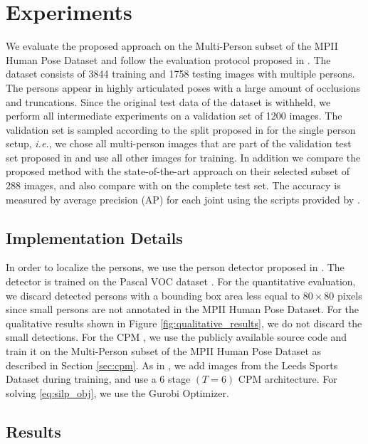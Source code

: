 \documentclass[runningheads]{llncs}
\newcommand{\ie}{\mbox{\emph{i.e.}}}
\begin{document}
\section{Experiments}
We evaluate the proposed approach on the Multi-Person subset of the MPII Human Pose Dataset \cite{andriluka_cvpr2014} and follow the evaluation protocol proposed in \cite{pishchulin2015deepcut}. The dataset consists of 3844 training and 1758 testing images with multiple persons. The persons appear in highly articulated poses with a large amount of occlusions and truncations. Since the original test data of the dataset is withheld, we perform all intermediate experiments on a validation set of 1200 images. The validation set is sampled according to the split proposed in \cite{tompson_cvpr2015} for the single person setup, \ie, we chose all multi-person images that are part of the validation test set proposed in \cite{tompson_cvpr2015} and use all other images for training. In addition we compare the proposed method with the state-of-the-art approach \cite{pishchulin2015deepcut} on their selected subset of 288 images, and also compare with \cite{insafutdinov2016deepercut} on the complete test set. The accuracy is measured by average precision (AP) for each joint using the scripts provided by \cite{pishchulin2015deepcut}. 

\subsection{Implementation Details}
In order to localize the persons, we use the person detector proposed in \cite{ren2015faster}. The detector is trained on the Pascal VOC dataset \cite{Everingham15}. For the quantitative evaluation, we discard detected persons with a 
bounding box area less equal to $80\times80$ pixels since small persons are not annotated in the MPII Human Pose Dataset. For the qualitative results shown in Figure \ref{fig:qualitative_results}, we do not discard the small detections. 
For the CPM \cite{wei2016convolutional}, we use the publicly available source code and train it on the Multi-Person subset of the MPII Human Pose Dataset as described in Section \ref{sec:cpm}. As in \cite{wei2016convolutional}, we add images from the Leeds Sports Dataset \cite{Ever10} during training, and use a 6 stage $(T=6)$ CPM architecture. For solving \eqref{eq:silp_obj}, we use the Gurobi Optimizer.

\subsection{Results}
\end{document}
